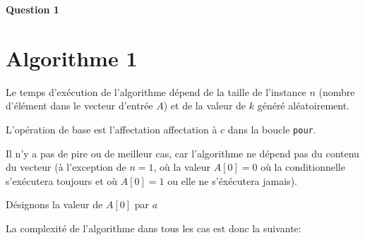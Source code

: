 \documentclass[class=article]{standalone}
\begin{document}
\centerline{\Huge \bf Question 1}
\bigskip

\section*{Algorithme 1}

Le temps d'exécution de l'algorithme dépend de la taille de l'instance $n$ 
(nombre d'élément dans le vecteur d'entrée $A$)
et de la valeur de $k$ généré aléatoirement. 

L'opération de base est l'affectation affectation à $c$ dans la boucle \lstinline{pour}.

Il n'y a pas de pire ou de meilleur cas, 
car l'algorithme ne dépend pas du contenu du vecteur (à l'exception de $n=1$,
où la valeur $A[0]=0$ où la conditionnelle s'exécutera toujours et où $A[0] = 1$ ou elle ne s'éxécutera jamais).

Désignons la valeur de $A[0]$ par $a$

La complexité de l'algorithme dans tous les cas est donc la suivante:
\end{document}
